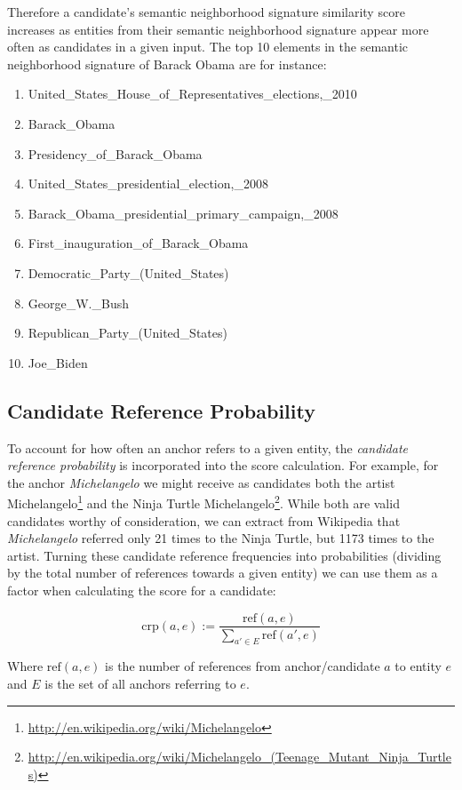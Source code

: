 \documentclass[runningheads,a4paper]{llncs}
\begin{document}
{Therefore a candidate's semantic neighborhood signature similarity score increases as entities from their semantic neighborhood signature appear more often as candidates in a given input.
The top 10 elements in the semantic neighborhood signature of Barack Obama are for instance:
\begin{enumerate}
\item United\_States\_House\_of\_Representatives\_elections,\_2010
\item Barack\_Obama
\item Presidency\_of\_Barack\_Obama
\item United\_States\_presidential\_election,\_2008
\item Barack\_Obama\_presidential\_primary\_campaign,\_2008
\item First\_inauguration\_of\_Barack\_Obama
\item Democratic\_Party\_(United\_States)
\item George\_W.\_Bush
\item Republican\_Party\_(United\_States)
\item Joe\_Biden
\end{enumerate}

\subsection{Candidate Reference Probability}

To account for how often an anchor refers to a given entity, the \emph{candidate reference probability} is incorporated into the score calculation. For example, for the anchor \textit{Michelangelo} we might receive as candidates both the artist Michelangelo\footnote{\url{http://en.wikipedia.org/wiki/Michelangelo}} and the Ninja Turtle Michelangelo\footnote{\url{http://en.wikipedia.org/wiki/Michelangelo_(Teenage_Mutant_Ninja_Turtles)}}. While both are valid candidates worthy of consideration, we can extract from Wikipedia that \textit{Michelangelo} referred only 21 times to the Ninja Turtle, but 1173 times to the artist. Turning these candidate reference frequencies into probabilities (dividing by the total number of references towards a given entity) we can use them as a factor when calculating the score for a candidate:

$$\mathrm{crp}(a, e) := \frac{\mathrm{ref}(a, e)}{{\sum\limits_{a'\in E} \mathrm{ref}(a', e)}}$$

Where $\mathrm{ref}(a, e)$ is the number of references from anchor/candidate $a$ to entity $e$ and $E$ is the set of all anchors referring to $e$.

}
\end{document}
